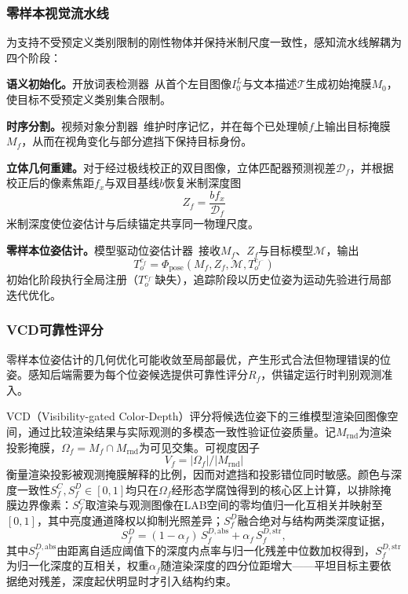 \documentclass[review]{vgtc}
\begin{document}
\subsubsection{零样本视觉流水线}

为支持不受预定义类别限制的刚性物体并保持米制尺度一致性，感知流水线解耦为四个阶段：

\textbf{语义初始化。}开放词表检测器~\cite{yoloe2025}从首个左目图像$I_0^L$与文本描述$\mathcal{T}$生成初始掩膜$M_0$，使目标不受预定义类别集合限制。

\textbf{时序分割。}视频对象分割器~\cite{cutie2024}维护时序记忆，并在每个已处理帧$f$上输出目标掩膜$M_f$，从而在视角变化与部分遮挡下保持目标身份。

\textbf{立体几何重建。}对于经过极线校正的双目图像，立体匹配器预测视差$\mathcal{D}_f$，并根据校正后的像素焦距$f_x$与双目基线$b$恢复米制深度图
\begin{equation}
Z_f = \frac{b f_x}{\mathcal{D}_f}
\label{eq:depth}
\end{equation}
米制深度使位姿估计与后续锚定共享同一物理尺度。

\textbf{零样本位姿估计。}模型驱动位姿估计器~\cite{foundationpose2023}接收$M_f$、$Z_f$与目标模型$\mathcal{M}$，输出
\begin{equation}
T_o^{c_f} = \Phi_{\mathrm{pose}}(M_f, Z_f, \mathcal{M}, T_o^{c_{f^-}})
\label{eq:pose}
\end{equation}
初始化阶段执行全局注册（$T_o^{c_{f^-}}$缺失），追踪阶段以历史位姿为运动先验进行局部迭代优化。

\subsubsection{VCD可靠性评分}

零样本位姿估计的几何优化可能收敛至局部最优，产生形式合法但物理错误的位姿。感知后端需要为每个位姿候选提供可靠性评分$R_f$，供锚定运行时判别观测准入。

VCD（Visibility-gated Color-Depth）评分将候选位姿下的三维模型渲染回图像空间，通过比较渲染结果与实际观测的多模态一致性验证位姿质量。记$M_{\mathrm{rnd}}$为渲染投影掩膜，$\Omega_f = M_f \cap M_{\mathrm{rnd}}$为可见交集。可视度因子
\begin{equation}
V_f = |\Omega_f| / |M_{\mathrm{rnd}}|
\label{eq:visibility}
\end{equation}
衡量渲染投影被观测掩膜解释的比例，因而对遮挡和投影错位同时敏感。颜色与深度一致性$S_f^C, S_f^D \in [0,1]$均只在$\Omega_f$经形态学腐蚀得到的核心区上计算，以排除掩膜边界像素：$S_f^C$取渲染与观测图像在LAB空间的零均值归一化互相关并映射至$[0,1]$，其中亮度通道降权以抑制光照差异；$S_f^D$融合绝对与结构两类深度证据，
\begin{equation}
S_f^D = (1-\alpha_f)\,S_f^{D,\mathrm{abs}} + \alpha_f\,S_f^{D,\mathrm{str}},
\label{eq:depth-score}
\end{equation}
其中$S_f^{D,\mathrm{abs}}$由距离自适应阈值下的深度内点率与归一化残差中位数加权得到，$S_f^{D,\mathrm{str}}$为归一化深度的互相关，权重$\alpha_f$随渲染深度的四分位距增大——平坦目标主要依据绝对残差，深度起伏明显时才引入结构约束。
\end{document}
